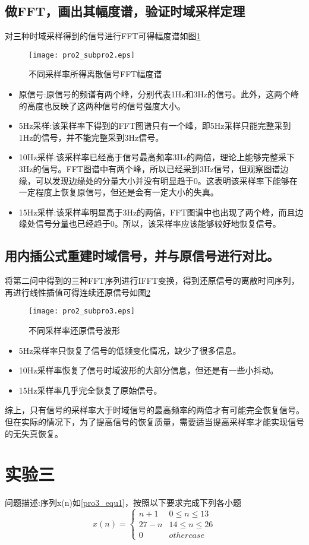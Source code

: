 \documentclass[aps,letterpaper,10pt]{revtex4}
\begin{document}
\begin{CJK}{UTF8}{gkai}
\subsection{做FFT，画出其幅度谱，验证时域采样定理}
对三种时域采样得到的信号进行FFT可得幅度谱如图\ref{pro2_fig2}
\begin{figure}
  \centering
  \texttt{[image: pro2\_subpro2.eps]}
  \caption{不同采样率所得离散信号FFT幅度谱}
  \label{pro2_fig2}
\end{figure}
\begin{itemize}
  \item 原信号:原信号的频谱有两个峰，分别代表1Hz和3Hz的信号。此外，这两个峰的高度也反映了这两种信号的信号强度大小。
  \item 5Hz采样:该采样率下得到的FFT图谱只有一个峰，即5Hz采样只能完整采到1Hz的信号，并不能完整采到3Hz信号。
  \item 10Hz采样:该采样率已经高于信号最高频率3Hz的两倍，理论上能够完整采下3Hz的信号。FFT图谱中有两个峰，所以已经采到3Hz信号，但观察图谱边缘，可以发现边缘处的分量大小并没有明显趋于0。这表明该采样率下能够在一定程度上恢复原信号，但还是会有一定大小的失真。
  \item 15Hz采样:该采样率明显高于3Hz的两倍，FFT图谱中也出现了两个峰，而且边缘处信号分量也已经趋于0。所以，该采样率应该能够较好地恢复信号。
\end{itemize}

\subsection{用内插公式重建时域信号，并与原信号进行对比。}
将第二问中得到的三种FFT序列进行IFFT变换，得到还原信号的离散时间序列，再进行线性插值可得连续还原信号如图\ref{pro2_fig3}
\begin{figure}
  \centering
  \texttt{[image: pro2\_subpro3.eps]}
  \caption{不同采样率还原信号波形}
  \label{pro2_fig3}
\end{figure}
\begin{itemize}
  \item 5Hz采样率只恢复了信号的低频变化情况，缺少了很多信息。
  \item 10Hz采样率恢复了信号时域波形的大部分信息，但还是有一些小抖动。
  \item 15Hz采样率几乎完全恢复了原始信号。
\end{itemize}
综上，只有信号的采样率大于时域信号的最高频率的两倍才有可能完全恢复信号。但在实际的情况下，为了提高信号的恢复质量，需要适当提高采样率才能实现信号的无失真恢复。

\section{实验三}
问题描述:序列x(n)如\ref{pro3_equ1}，按照以下要求完成下列各小题
\begin{equation}
  x(n)=\left\{
  \begin{array}{cc}
    n+1 & 0\leq n\leq13\\
    27-n & 14\leq n\leq26\\
    0 & other case
  \end{array}
  \right.
  \label{pro3_equ1}
\end{equation}

\end{CJK}
\end{document}
